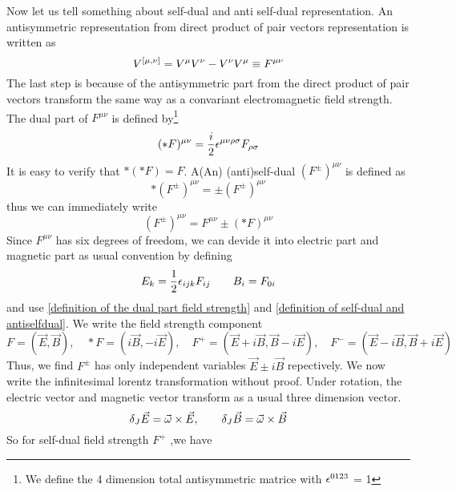  Now let us tell something about self-dual and anti self-dual representation.
 An antisymmetric representation from direct product of pair vectors representation is written as
 \begin{equation}
    V^{[\mu,\nu]} = V^{\mu}V^{\nu}-V^{\nu}V^{\mu} \equiv F^{\mu\nu}
 \end{equation} 
 The last step is because of the antisymmetric part from the direct product of pair vectors transform the same way as a convariant electromagnetic field strength.
 The dual part of $F^{\mu\nu}$ is defined by\footnote{We define the 4 dimension total antisymmetric matrice with $\epsilon^{0123}$ = 1}
 \begin{equation}\label{definition of the dual part field strength}
   (*F)^{\mu\nu} = \frac{i}{2}\epsilon^{\mu\nu\rho\sigma} F_{\rho\sigma}
 \end{equation}
 It is easy to verify that $*(*F) = F$.
 A(An) (anti)self-dual $(F^{\pm})^{\mu\nu}$ is defined as
 \begin{equation}\label{definition of self-dual and antiselfdual}
   *(F^{\pm})^{\mu\nu} = \pm (F^{\pm})^{\mu\nu}
 \end{equation}  
 thus we can immediately write
 \begin{equation}
    (F^{\pm})^{\mu\nu} = F^{\mu\nu} \pm (*F)^{\mu\nu}
 \end{equation}
 Since $F^{\mu\nu}$ has six degrees of freedom, we can devide it into electric part and magnetic part as usual convention by defining
 \begin{equation}
  E_k =\frac{1}{2} \epsilon_{ijk} F_{ij} \qquad B_i = F_{0i}
 \end{equation}
 and use \eqref{definition of the dual part field strength} and \eqref{definition of self-dual and antiselfdual}. We write the field strength component
 \begin{equation}
   F = (\vec{E},\vec{B}), \quad *F = (i\vec{B},-i\vec{E}), \quad
   F^{+} = ( \vec{E} + i\vec{B} , \vec{B} -i\vec{E}), \quad
   F^{-} = ( \vec{E} - i\vec{B} , \vec{B} +i\vec{E})
   \end{equation}
  Thus, we find $F^{\pm}$ has only independent variables $\vec{E}\pm i \vec{B}$ repectively. We now write the infinitesimal lorentz transformation without proof. Under rotation, the electric vector and magnetic vector transform as a usual three dimension vector.
  \begin{equation}
  \delta_J\vec{E} = \vec{\omega} \times \vec{E},\qquad 
  \delta_J\vec{B} = \vec{\omega} \times \vec{B}
  \end{equation}
  So for self-dual field strength $F^{+}$ ,we have
